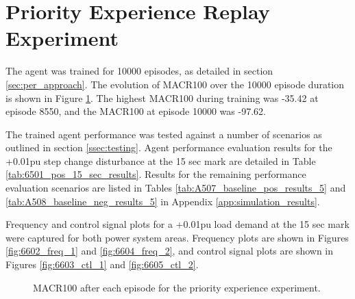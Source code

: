 \section{Priority Experience Replay Experiment}
The agent was trained for 10000 episodes, as detailed in section \ref{sec:per_approach}. The evolution of MACR100 over the 10000 episode duration is shown in Figure \ref{fig:6601_average_reward}. The highest MACR100 during training was -35.42 at episode 8550, and the MACR100 at episode 10000 was -97.62.

The trained agent performance was tested against a number of scenarios as outlined in section \ref{ssec:testing}. Agent performance evaluation results for the +0.01pu step change disturbance at the 15 sec mark are detailed in Table \ref{tab:6501_pos_15_sec_results}. Results for the remaining performance evaluation scenarios are listed in Tables \ref{tab:A507_baseline_pos_results_5} and \ref{tab:A508_baseline_neg_results_5} in Appendix \ref{app:simulation_results}.

Frequency and control signal plots for a +0.01pu load demand at the 15 sec mark were captured for both power system areas. Frequency plots are shown in Figures \ref{fig:6602_freq_1} and \ref{fig:6604_freq_2}, and control signal plots are shown in Figures \ref{fig:6603_ctl_1} and \ref{fig:6605_ctl_2}.

\begin{figure}[h]
	\centering
	
	\caption{MACR100 after each episode for the priority experience experiment.}\label{fig:6601_average_reward}
\end{figure}



